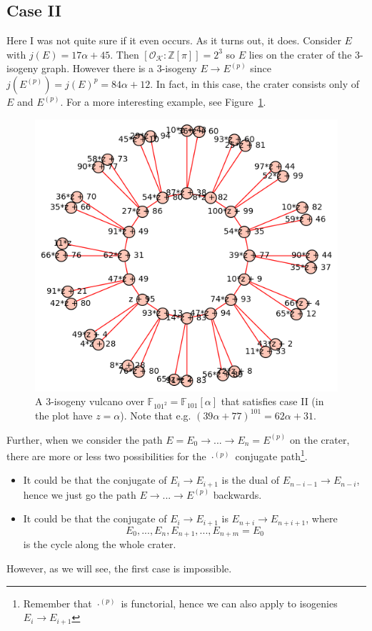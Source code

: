 \documentclass{scrartcl}
\newcommand{\Z}{\mathbb{Z}}
\newcommand{\F}{\mathbb{F}}
\newcommand{\K}{\mathcal{K}}
\renewcommand{\O}{\mathcal{O}}
\theoremstyle{definition}
\begin{document}
\subsection{Case II}
Here I was not quite sure if it even occurs. As it turns out, it does.
Consider $E$ with $j(E) = 17\alpha + 45$.
Then $[\O_\K : \Z[\pi]] = 2^3$ so $E$ lies on the crater of the 3-isogeny graph.
However there is a 3-isogeny $E \to E^{(p)}$ since $j(E^{(p)}) = j(E)^p = 84 \alpha + 12$.
In fact, in this case, the crater consists only of $E$ and $E^{(p)}$.
For a more interesting example, see Figure~\ref{fig:example_II}.
\begin{figure}
    \includegraphics{./example_II.png}
    \caption{\label{fig:example_II} A 3-isogeny vulcano over $\F_{101^2} = \F_{101}[\alpha]$ that satisfies case II (in the plot have $z = \alpha$). Note that e.g. $(39\alpha + 77)^{101} = 62\alpha + 31$.}
\end{figure}

Further, when we consider the path $E = E_0 \to ... \to E_n = E^{(p)}$ on the crater, there are more or less two possibilities for the $\cdot^{(p)}$ conjugate path\footnote{Remember that $\cdot^{(p)}$ is functorial, hence we can also apply to isogenies $E_i \to E_{i + 1}$}.
\begin{itemize}
    \item It could be that the conjugate of $E_i \to E_{i + 1}$ is the dual of $E_{n - i - 1} \to E_{n - i}$, hence we just go the path $E \to ... \to E^{(p)}$ backwards.
    \item It could be that the conjugate of $E_i \to E_{i + 1}$ is $E_{n + i} \to E_{n + i + 1}$, where
    \begin{equation*}
        E_0, ..., E_n, E_{n + 1}, ..., E_{n + m} = E_0
    \end{equation*}
    is the cycle along the whole crater.
\end{itemize}
However, as we will see, the first case is impossible.
\end{document}
